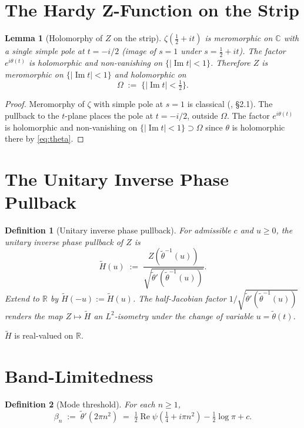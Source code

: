 \documentclass[11pt]{article}
\newtheorem{lemma}{Lemma}
\newtheorem{definition}{Definition}
\DeclareMathOperator{\ImOp}{Im}
\DeclareMathOperator{\ReOp}{Re}
\let\Im\ImOp
\let\Re\ReOp
\begin{document}
\section{The Hardy Z-Function on the Strip}

\begin{lemma}[Holomorphy of $Z$ on the strip]\label{lem:Zholo}
$\zeta(\tfrac{1}{2}+it)$ is meromorphic on $\mathbb{C}$ with a single simple pole at $t=-i/2$ (image of $s=1$ under $s=\tfrac{1}{2}+it$). The factor $e^{i\theta(t)}$ is holomorphic and non-vanishing on $\{|\Im t|<1\}$. Therefore $Z$ is meromorphic on $\{|\Im t|<1\}$ and holomorphic on
\[
\Omega \;:=\; \{|\Im t|<\tfrac{1}{2}\}.
\]
\end{lemma}

\begin{proof}
Meromorphy of $\zeta$ with simple pole at $s=1$ is classical (\cite{Titchmarsh}, \S2.1). The pullback to the $t$-plane places the pole at $t=-i/2$, outside $\Omega$. The factor $e^{i\theta(t)}$ is holomorphic and non-vanishing on $\{|\Im t|<1\}\supset\Omega$ since $\theta$ is holomorphic there by \eqref{eq:theta}.
\end{proof}

\section{The Unitary Inverse Phase Pullback}

\begin{definition}[Unitary inverse phase pullback]\label{def:Htilde}
For admissible $c$ and $u\ge 0$, the \emph{unitary inverse phase pullback} of $Z$ is
\[
\tilde H(u) \;:=\; \frac{Z(\tilde\theta^{-1}(u))}{\sqrt{\tilde\theta'(\tilde\theta^{-1}(u))}}.
\]
Extend to $\mathbb{R}$ by $\tilde H(-u):=\tilde H(u)$. The half-Jacobian factor $1/\sqrt{\tilde\theta'(\tilde\theta^{-1}(u))}$ renders the map $Z\mapsto\tilde H$ an $L^2$-isometry under the change of variable $u=\tilde\theta(t)$.
\end{definition}

$\tilde H$ is real-valued on $\mathbb{R}$.

\section{Band-Limitedness}

\begin{definition}[Mode threshold]\label{def:betan}
For each $n\ge 1$,
\[
\beta_n \;:=\; \tilde\theta'(2\pi n^2) \;=\; \tfrac{1}{2}\Re\psi\!\left(\tfrac{1}{4}+i\pi n^2\right) - \tfrac{1}{2}\log\pi + c.
\]
\end{definition}
\end{document}
